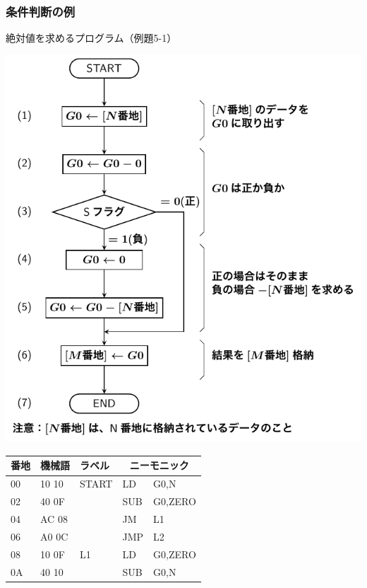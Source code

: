 \documentclass{beamer}                 %
\begin{document}
\begin{frame}
  \frametitle{条件判断の例}
  絶対値を求めるプログラム（例題5-1）\\
  \vfill
  \begin{minipage}{0.49\columnwidth}
    \centerline{\includegraphics[scale=0.5]{../Tikz/flow1.pdf}}
  \end{minipage}
  \begin{minipage}{0.5\columnwidth}
    {\ttfamily\scriptsize\begin{center}
      \begin{tabular}{|l|l|l|l l|}
        \hline
        番地 & 機械語 & ラベル & \multicolumn{2}{|c|}{ニーモニック} \\
        \hline
        00 & 10 10 & START& LD   & G0,N    \\
        02 & 40 0F &      & SUB  & G0,ZERO \\
        04 & AC 08 &      & JM   & L1      \\
        06 & A0 0C &      & JMP  & L2      \\
        08 & 10 0F & L1   & LD   & G0,ZERO \\
        0A & 40 10 &      & SUB  & G0,N    \\

\end{tabular}
\end{center}}
\end{minipage}
\end{frame}
\end{document}
